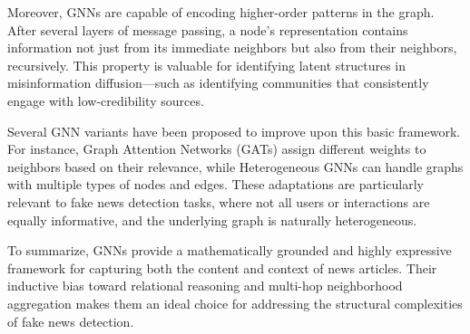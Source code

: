Moreover, GNNs are capable of encoding higher-order patterns in the graph. After several layers of message passing, a node's representation contains information not just from its immediate neighbors but also from their neighbors, recursively. This property is valuable for identifying latent structures in misinformation diffusion—such as identifying communities that consistently engage with low-credibility sources.

Several GNN variants have been proposed to improve upon this basic framework. For instance, Graph Attention Networks (GATs) assign different weights to neighbors based on their relevance, while Heterogeneous GNNs can handle graphs with multiple types of nodes and edges. These adaptations are particularly relevant to fake news detection tasks, where not all users or interactions are equally informative, and the underlying graph is naturally heterogeneous.

To summarize, GNNs provide a mathematically grounded and highly expressive framework for capturing both the content and context of news articles. Their inductive bias toward relational reasoning and multi-hop neighborhood aggregation makes them an ideal choice for addressing the structural complexities of fake news detection.
